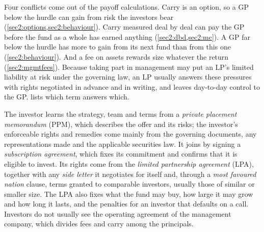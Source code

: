 \begin{chapterrefs}
Four conflicts come out of the payoff calculations. Carry is an option, so a GP below the
hurdle can gain from risk the investors bear (\cref{sec2:options,sec2:behaviour}). Carry measured deal
by deal can pay the GP before the fund as a whole has earned anything (\cref{sec2:dbd,sec2:mc}). A GP
far below the hurdle has more to gain from its next fund than from this one (\cref{sec2:behaviour}).
And a fee on assets rewards size whatever the return (\cref{sec2:mgmtfees}). Because taking part in management may put an LP's limited liability at risk under the governing law,
an LP usually answers these pressures with rights negotiated in advance and in writing, and leaves
day-to-day control to the GP.  lists which term answers which.

The investor learns the strategy, team and terms from a \emph{private placement memorandum} (PPM),
which describes the offer and its risks; the investor's enforceable rights and remedies come mainly
from the governing documents, any representations made and the applicable securities law. It joins by signing a
\emph{subscription agreement}, which fixes its commitment and confirms that it is eligible to invest.
Its rights come from the \emph{limited partnership agreement} (LPA), together with any \emph{side letter}
it negotiates for itself and, through a \emph{most favoured nation} clause, terms granted to comparable
investors, usually those of similar or smaller size. The LPA also fixes what the fund may buy, how
large it may grow and how long it lasts, and the penalties for an investor that defaults on a call.
Investors do not usually see the operating agreement of the management company, which divides fees
and carry among the principals.


\end{chapterrefs}
